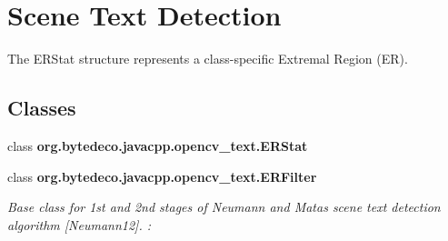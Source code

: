 \hypertarget{group__text__detect}{}\section{Scene Text Detection}
\label{group__text__detect}


The E\+R\+Stat structure represents a class-\/specific Extremal Region (ER).  


\subsection*{Classes}
\begin{DoxyCompactItemize}
\item 
class {\bfseries org.\+bytedeco.\+javacpp.\+opencv\+\_\+text.\+E\+R\+Stat}
\item 
class {\bfseries org.\+bytedeco.\+javacpp.\+opencv\+\_\+text.\+E\+R\+Filter}
\begin{DoxyCompactList}\small\item\em Base class for 1st and 2nd stages of Neumann and Matas scene text detection algorithm \mbox{[}Neumann12\mbox{]}. \+: \end{DoxyCompactList}\end{DoxyCompactItemize}
